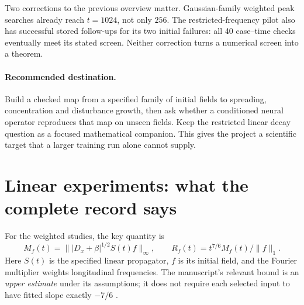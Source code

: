 \documentclass[11pt]{article}
\begin{document}
Two corrections to the previous overview matter. Gaussian-family weighted peak searches already reach $t=1024$, not only $256$. The restricted-frequency pilot also has successful stored follow-ups for its two initial failures: all 40 case--time checks eventually meet its stated screen. Neither correction turns a numerical screen into a theorem.

\paragraph{Recommended destination.}
Build a checked map from a specified family of initial fields to spreading, concentration and disturbance growth, then ask whether a conditioned neural operator reproduces that map on unseen fields. Keep the restricted linear decay question as a focused mathematical companion. This gives the project a scientific target that a larger training run alone cannot supply.

\newpage
\section{Linear experiments: what the complete record says}
For the weighted studies, the key quantity is
\[
 M_f(t)=\|\lvert D_x+\beta\rvert^{1/2}S(t)f\|_{\infty},
 \qquad R_f(t)=t^{7/6}M_f(t)/\|f\|_1.
\]
Here $S(t)$ is the specified linear propagator, $f$ is its initial field, and the Fourier multiplier weights longitudinal frequencies. The manuscript's relevant bound is an \emph{upper estimate} under its assumptions; it does not require each selected input to have fitted slope exactly $-7/6$ \cite[\S6.3]{MPS}.
\end{document}
